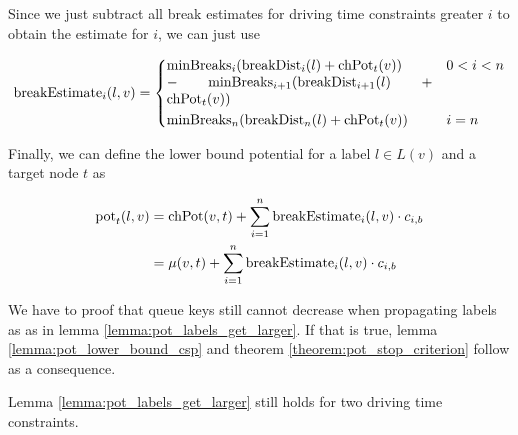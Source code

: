 Since we just subtract all break estimates for driving time constraints greater $i$ to obtain the estimate for $i$, we can just use

\begin{align}\label{eq:break_estimate_n}
	\breakEstimate_i(l,v) = \begin{dcases}
		\parbox[t]{.55\textwidth}{$\minBreaks_i(\breakDist_i(l) + \chpotential_t(v)) \\- \minBreaks_{i+1}(\breakDist_{i+1}(l) + \chpotential_t(v))$} & 0 < i < n \\
		\minBreaks_n(\breakDist_n(l) + \chpotential_t(v)) & i=n
	\end{dcases}
\end{align}

Finally, we can define the lower bound potential for a label $l \in L(v)$ and a target node $t$ as

\begin{align}\label{eq:multiple_breaks_pot}
	\begin{split}
		\operatorname{pot}_t(l,v) & =\operatorname{chPot}(v,t) + \sum_{i=1}^n{ \operatorname{breakEstimate}_i(l,v) \cdot c_{i,b}}\\
		& = \mu(v,t) + \sum_{i=1}^n{ \operatorname{breakEstimate}_i(l,v) \cdot c_{i,b}}
	\end{split}
\end{align}

We have to proof that queue keys still cannot decrease when propagating labels as as in lemma \ref{lemma:pot_labels_get_larger}. If that is true, lemma \ref{lemma:pot_lower_bound_csp} and theorem \ref{theorem:pot_stop_criterion} follow as a consequence.

\begin{lemma}
	Lemma \ref{lemma:pot_labels_get_larger} still holds for two driving time constraints.
\end{lemma}

